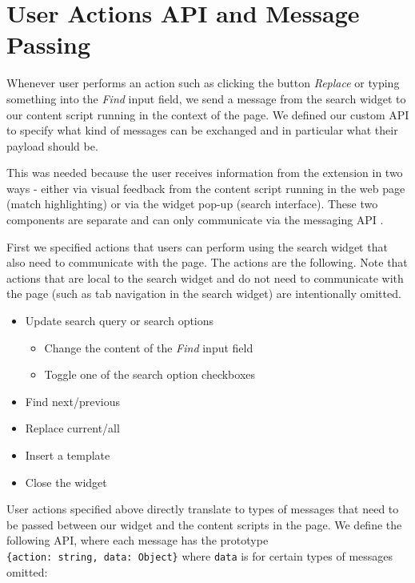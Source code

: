 \documentclass[bsc,frontabs,twoside,singlespacing,parskip,deptreport]{infthesis}
\providecommand{\tightlist}{%
  \setlength{\itemsep}{0pt}\setlength{\parskip}{0pt}}
\begin{document}
\section{User Actions API and Message Passing}
Whenever user performs an action such as clicking the button \textit{Replace} or typing something into the \textit{Find} input field, we send a message from the search widget to our content script running in the context of the page. We defined our custom API to specify what kind of messages can be exchanged and in particular what their payload should be.

This was needed because the user receives information from the extension in two ways - either via visual feedback from the content script running in the web page (match highlighting) or via the widget pop-up (search interface). These two components are separate and can only communicate via the messaging API \cite{C5}.

First we specified actions that users can perform using the search widget that also need to communicate with the page. The actions are the following. Note that actions that are local to the search widget and do not need to communicate with the page (such as tab navigation in the search widget) are intentionally omitted.

\begin{itemize}
\tightlist
\item
  Update search query or search options
  \begin{itemize}
  \tightlist
  \item
    Change the content of the \textit{Find} input field
  \item
    Toggle one of the search option checkboxes
  \end{itemize}
\item
  Find next/previous
\item
  Replace current/all
\item
  Insert a template
\item
  Close the widget
\end{itemize}

User actions specified above directly translate to types of messages
that need to be passed between our widget and the content scripts in the page. We define the following API, where each message has the prototype \texttt{\{action:\ string,\ data:\ Object\}} where \texttt{data} is for certain types of messages omitted:
\end{document}
